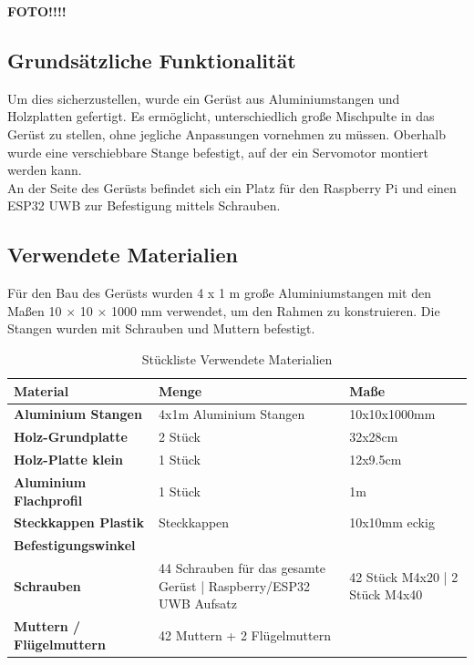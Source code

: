 \textbf{FOTO!!!!}


\subsection{Grundsätzliche Funktionalität}
Um dies sicherzustellen, wurde ein Gerüst aus Aluminiumstangen und Holzplatten gefertigt. Es ermöglicht, unterschiedlich große Mischpulte in das Gerüst zu stellen, ohne jegliche Anpassungen vornehmen zu müssen. Oberhalb wurde eine verschiebbare Stange befestigt, auf der ein Servomotor montiert werden kann.\\
An der Seite des Gerüsts befindet sich ein Platz für den Raspberry Pi und einen ESP32 UWB zur Befestigung mittels Schrauben.


\subsection{Verwendete Materialien}
Für den Bau des Gerüsts wurden 4 x 1 m große Aluminiumstangen mit den Maßen 10 × 10 × 1000 mm verwendet, um den Rahmen zu konstruieren. Die Stangen wurden mit Schrauben und Muttern befestigt.\\

\begin{table} [H]
	\begin{tabular}{ |p{3.1cm} |p{4.8cm}|p{4.8cm}| }
		\hline
		\textbf{Material} & \textbf{Menge}& \textbf{Maße}\\
		\hline
		\textbf{Aluminium Stangen} & 4x1m Aluminium Stangen & 10x10x1000mm  \\ 
		\hline
		\textbf{Holz-Grundplatte} & 2 Stück & 32x28cm   \\  
		\hline
		\textbf{Holz-Platte klein} & 1 Stück & 12x9.5cm   \\  
		\hline
		\textbf{Aluminium Flachprofil} & 1 Stück  & 1m \\
		\hline
		\textbf{Steckkappen Plastik} & Steckkappen & 10x10mm eckig  \\
		\hline
		\textbf{Befestigungswinkel}&  &  \\
		\hline
		\textbf{Schrauben}& 44 Schrauben für das gesamte Gerüst | 	Raspberry/ESP32 UWB Aufsatz & 42 Stück M4x20 | 2 Stück M4x40\\
		\hline
		\textbf{Muttern / Flügelmuttern}& 42 Muttern + 2 Flügelmuttern & \\
		\hline	
	\end{tabular}
	\caption{Stückliste Verwendete Materialien} 
\end{table} 

